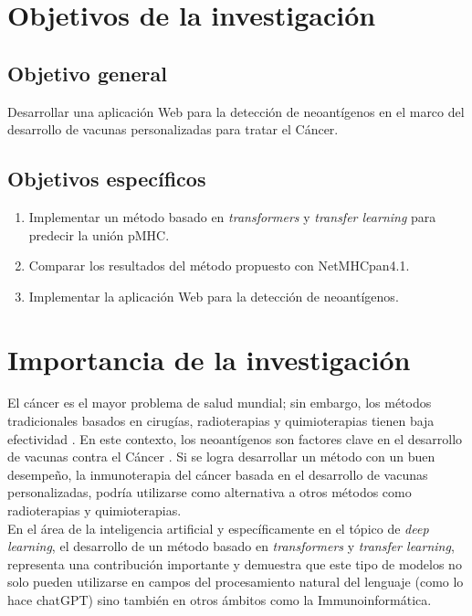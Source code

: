\documentclass[a4paper]{article}
\begin{document}
	
\section{Objetivos de la investigación}
	
	\subsection{Objetivo general}
	
	Desarrollar una aplicación Web para la detección de neoantígenos en el marco del desarrollo de vacunas personalizadas para tratar el Cáncer.
	
	\subsection{Objetivos específicos}
	\begin{enumerate}
		\item Implementar un método basado en \textit{transformers} y \textit{transfer learning} para predecir la unión pMHC.	
		\item Comparar los resultados del método propuesto con NetMHCpan4.1.
		\item Implementar la aplicación Web para la detección de neoantígenos.
	

		

		
	\end{enumerate}

	
\section{Importancia de la investigación}

El cáncer es el mayor problema de salud mundial; sin embargo, los métodos tradicionales basados en cirugías, radioterapias y quimioterapias tienen baja efectividad \citep{peng2019neoantigen}. En este contexto, los neoantígenos son factores clave en el desarrollo de vacunas contra el Cáncer  \citep{borden2022cancer,chen2021challenges,gopanenko2020main}. Si se logra desarrollar un método con un buen desempeño, la inmunoterapia del cáncer basada en el desarrollo de vacunas personalizadas, podría utilizarse como alternativa a otros métodos como radioterapias y quimioterapias. \\

En el área de la inteligencia artificial y específicamente en el tópico de \textit{deep learning}, el desarrollo de un método basado en \textit{transformers} y \textit{transfer learning}, representa una contribución importante  y demuestra que este tipo de modelos no solo pueden utilizarse en campos del procesamiento natural del lenguaje (como lo hace chatGPT) sino también en otros ámbitos como la Immunoinformática.\\
\end{document}
